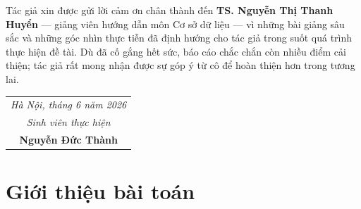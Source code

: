 \documentclass[11pt]{report}
\makeatletter
\let\ps@plain\ps@fancy
\makeatother
\begin{document}
Tác giả xin được gửi lời cảm ơn chân thành đến \textbf{TS. Nguyễn Thị Thanh Huyển} --- giảng viên hướng dẫn môn Cơ sở dữ liệu --- vì những bài giảng sâu sắc và những góc nhìn thực tiễn đã định hướng cho tác giả trong suốt quá trình thực hiện đề tài. Dù đã cố gắng hết sức, báo cáo chắc chắn còn nhiều điểm cải thiện; tác giả rất mong nhận được sự góp ý từ cô để hoàn thiện hơn trong tương lai.

\vspace{21pt} 
\begin{flushright}
\begin{tabular}{c}
\textit{Hà Nội, tháng 6 năm 2026} \\
\textit{Sinh viên thực hiện} \\
\textbf{Nguyễn Đức Thành}
\end{tabular}
\end{flushright}


\clearpage
\makeatletter
\let\ps@plain\ps@empty
\makeatother
{}
\listoffigures
\makeatletter
\let\ps@plain\ps@empty
\makeatother
\clearpage


\clearpage
\makeatletter
\let\ps@plain\ps@empty
\makeatother
{}
\listoftables
\makeatletter
\let\ps@plain\ps@empty
\makeatother
\clearpage


\clearpage
\makeatletter
\let\ps@plain\ps@empty
\makeatother
\pagestyle{empty}
\tableofcontents
\thispagestyle{empty}
\makeatletter
\let\ps@plain\ps@fancy
\makeatother
\clearpage


\pagestyle{fancy}


\chapter{Giới thiệu bài toán}
\label{chap:gioithieu}
\end{document}
